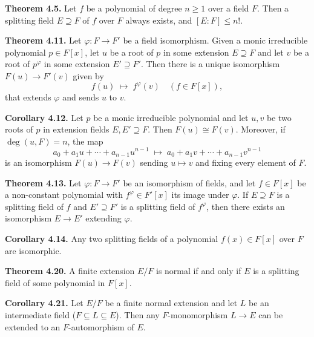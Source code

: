 \documentclass{article}
\newenvironment{theoremx}[1]{\noindent\textbf{Theorem #1.} }{\par}
\newenvironment{corollaryx}[1]{\noindent\textbf{Corollary #1.} }{\par}
\begin{document}
\begin{theoremx}{4.5}
Let $f$ be a polynomial of degree $n\ge1$ over a field $F$.  Then a splitting field $E\supseteq F$ of $f$ over $F$ always exists, and $[E:F]\le n!$.
\end{theoremx}

\begin{theoremx}{4.11}
Let $\varphi: F \to F'$ be a field isomorphism.  Given a monic irreducible polynomial $p\in F[x]$, let $u$ be a root of $p$ in some extension $E\supseteq F$ and let $v$ be a root of $p^\varphi$ in some extension $E'\supseteq F'$.  Then there is a unique isomorphism $F(u)\to F'(v)$ given by 
\[
  f(u) \;\mapsto\; f^\varphi(v) \quad (f\in F[x]),
\]
that extends $\varphi$ and sends $u$ to $v$.
\end{theoremx}

\begin{corollaryx}{4.12}
Let $p$ be a monic irreducible polynomial and let $u,v$ be two roots of $p$ in extension fields $E,E'\supseteq F$.  Then $F(u)\cong F(v)$.  Moreover, if $\deg(u,F)=n$, the map 
\[
  a_0 + a_1u + \cdots + a_{n-1}u^{n-1} \;\longmapsto\; a_0 + a_1v + \cdots + a_{n-1}v^{n-1}
\]
is an isomorphism $F(u)\to F(v)$ sending $u\mapsto v$ and fixing every element of $F$.
\end{corollaryx}

\begin{theoremx}{4.13}
Let $\varphi:F\to F'$ be an isomorphism of fields, and let $f\in F[x]$ be a non-constant polynomial with $f^\varphi\in F'[x]$ its image under $\varphi$.  If $E\supseteq F$ is a splitting field of $f$ and $E'\supseteq F'$ is a splitting field of $f^\varphi$, then there exists an isomorphism $E\to E'$ extending $\varphi$.
\end{theoremx}

\begin{corollaryx}{4.14}
Any two splitting fields of a polynomial $f(x)\in F[x]$ over $F$ are isomorphic.
\end{corollaryx}

\begin{theoremx}{4.20}
A finite extension $E/F$ is normal if and only if $E$ is a splitting field of some polynomial in $F[x]$.
\end{theoremx}

\begin{corollaryx}{4.21}
Let $E/F$ be a finite normal extension and let $L$ be an intermediate field ($F\subseteq L\subseteq E$).  Then any $F$-monomorphism $L\to E$ can be extended to an $F$-automorphism of $E$.
\end{corollaryx}
\end{document}
